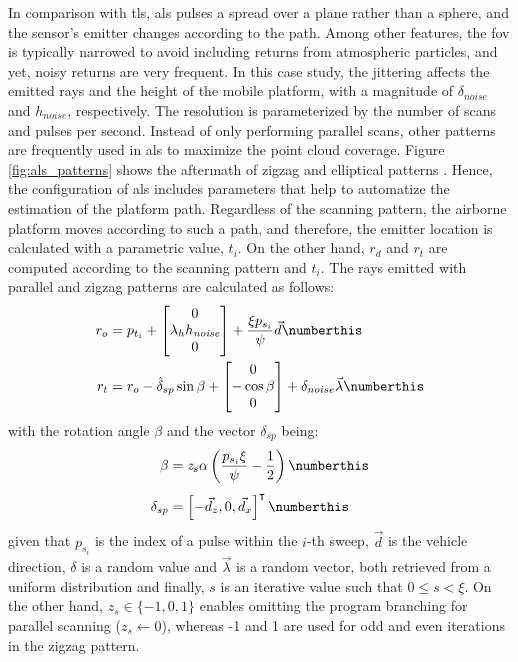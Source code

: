 In comparison with \acrshort{tls}, \acrshort{als} pulses a spread over a plane rather than a sphere, and the sensor's emitter changes according to the path. Among other features, the \acrshort{fov} is typically narrowed to avoid including returns from atmospheric particles, and yet, noisy returns are very frequent. In this case study, the jittering affects the emitted rays and the height of the mobile platform, with a magnitude of $\delta_{\textit{noise}}$ and $h_\textit{noise}$, respectively. The resolution is parameterized by the number of scans and pulses per second. Instead of only performing parallel scans, other patterns are frequently used in \acrshort{als} to maximize the point cloud coverage. Figure \ref{fig:als_patterns} shows the aftermath of zigzag and elliptical patterns \cite{dong_lidar_2018}. Hence, the configuration of \acrshort{als} includes parameters that help to automatize the estimation of the platform path. Regardless of the scanning pattern, the airborne platform moves according to such a path, and therefore, the emitter location is calculated with a parametric value, $t_i$. On the other hand, $r_d$ and $r_t$ are computed according to the scanning pattern and $t_i$. The rays emitted with parallel and zigzag patterns are calculated as follows:
\begin{align*}
    r_{o} &= p_{t_{i}} + 
    \begin{bmatrix} 0 \\ \lambda_{h}h_{\textit{noise}} \\ 0 \end{bmatrix} + \frac{\xi p_{s_{i}}}{\psi} \vec{d}
    \numberthis \label{eq:ray_origin_als_zigzag}\\
    r_{t} &= r_{o} - \hat{\delta}_{sp} \sin{\beta} +
    \begin{bmatrix}0 \\ -\cos{\beta}\\ 0 \end{bmatrix} + \delta_{noise}\vec{\lambda}
    \numberthis \label{eq:ray_target_als_zigzag}
\end{align*}
with the rotation angle $\beta$ and the vector $\delta_{sp}$ being:
\begin{align*}
    \beta &= \textit{z}_{s}\alpha \left(\frac{p_{s_{i}} \xi}{\psi} - \frac{1}{2}\right)
    \numberthis \label{eq:beta_als_zigzag}\\[0.4em]
    \delta_{sp} &= \left[-\vec{d}_{z}, 0, \vec{d}_{x}\right]^\intercal
    \numberthis \label{eq:rotation_axis_als_zigzag}
\end{align*}
given that $p_{s_{i}}$ is the index of a pulse within the $\textit{i}$-th sweep, $\vec{d}$ is the vehicle direction, $\delta$ is a random value and $\vec{\lambda}$ is a random vector, both retrieved from a uniform distribution and finally, $s$ is an iterative value such that $0 \leq s < \xi$. On the other hand, $\textit{z}_{s} \in \{-1, 0, 1\}$ enables omitting the program branching for parallel scanning ($\textit{z}_{s} \gets 0$), whereas -1 and 1 are used for odd and even iterations in the zigzag pattern.

